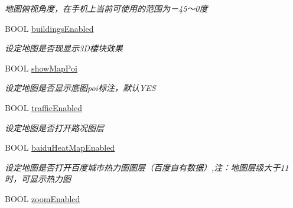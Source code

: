 \begin{DoxyCompactItemize}
\begin{DoxyCompactList}\small\item\em 地图俯视角度，在手机上当前可使用的范围为－45～0度 \end{DoxyCompactList}\item 
\hypertarget{interface_b_m_k_map_view_abccbae8b8f7182769b8e0b69a4383ceb}{}B\+O\+O\+L \hyperlink{interface_b_m_k_map_view_abccbae8b8f7182769b8e0b69a4383ceb}{buildings\+Enabled}\label{interface_b_m_k_map_view_abccbae8b8f7182769b8e0b69a4383ceb}

\begin{DoxyCompactList}\small\item\em 设定地图是否现显示3\+D楼块效果 \end{DoxyCompactList}\item 
\hypertarget{interface_b_m_k_map_view_a26be634d93e06efd2d7268a99bcca52f}{}B\+O\+O\+L \hyperlink{interface_b_m_k_map_view_a26be634d93e06efd2d7268a99bcca52f}{show\+Map\+Poi}\label{interface_b_m_k_map_view_a26be634d93e06efd2d7268a99bcca52f}

\begin{DoxyCompactList}\small\item\em 设定地图是否显示底图poi标注，默认\+Y\+E\+S \end{DoxyCompactList}\item 
\hypertarget{interface_b_m_k_map_view_a513d0877fb66681b10ad7a4ed1346cb7}{}B\+O\+O\+L \hyperlink{interface_b_m_k_map_view_a513d0877fb66681b10ad7a4ed1346cb7}{traffic\+Enabled}\label{interface_b_m_k_map_view_a513d0877fb66681b10ad7a4ed1346cb7}

\begin{DoxyCompactList}\small\item\em 设定地图是否打开路况图层 \end{DoxyCompactList}\item 
\hypertarget{interface_b_m_k_map_view_a9bc2c71421081064f9dbbd2a656172ff}{}B\+O\+O\+L \hyperlink{interface_b_m_k_map_view_a9bc2c71421081064f9dbbd2a656172ff}{baidu\+Heat\+Map\+Enabled}\label{interface_b_m_k_map_view_a9bc2c71421081064f9dbbd2a656172ff}

\begin{DoxyCompactList}\small\item\em 设定地图是否打开百度城市热力图图层（百度自有数据）,注：地图层级大于11时，可显示热力图 \end{DoxyCompactList}\item 
\hypertarget{interface_b_m_k_map_view_acf8472da994b76cef21a40673a41f774}{}B\+O\+O\+L \hyperlink{interface_b_m_k_map_view_acf8472da994b76cef21a40673a41f774}{zoom\+Enabled}\label{interface_b_m_k_map_view_acf8472da994b76cef21a40673a41f774}


\end{DoxyCompactItemize}
